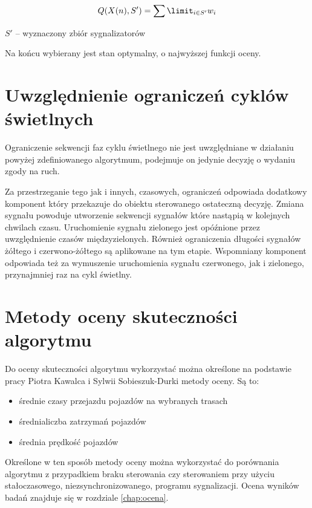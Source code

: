 \begin{equation}
\label{eq:wagi_suma}
	Q (X(n), S') = \sum\limit_{i \in S'} w_{i}
\end{equation}

\begin{math} S' \end{math} \textrm{ -- wyznaczony zbiór sygnalizatorów}

\vspace{0.5cm}
Na końcu wybierany jest stan optymalny, o najwyższej funkcji oceny.

\section{Uwzględnienie ograniczeń cyklów świetlnych}
Ograniczenie sekwencji faz cyklu świetlnego nie jest uwzględniane w działaniu powyżej zdefiniowanego algorytmum, podejmuje on jedynie decyzję o wydaniu zgody na ruch.

Za przestrzeganie tego jak i innych, czasowych, ograniczeń odpowiada dodatkowy komponent który przekazuje do obiektu sterowanego ostateczną decyzję. Zmiana sygnału powoduje utworzenie sekwencji sygnałów które nastąpią w kolejnych chwilach czasu. Uruchomienie sygnału zielonego jest opóźnione przez uwzględnienie czasów międzyzielonych. Również ograniczenia długości sygnałów żółtego i czerwono-żółtego są aplikowane na tym etapie. Wspomniany komponent odpowiada też za wymuszenie uruchomienia sygnału czerwonego, jak i zielonego, przynajmniej raz na cykl świetlny.

\section{Metody oceny skuteczności algorytmu}
Do oceny skuteczności algorytmu wykorzystać można określone na podstawie pracy Piotra Kawalca i Sylwii Sobieszuk-Durki \cite{kawalec+sobieszuk-durka} metody oceny. Są to:
\begin{itemize}
	\item średnie czasy przejazdu pojazdów na wybranych trasach
	\item średnialiczba zatrzymań pojazdów
	\item średnia prędkość pojazdów
\end{itemize}

Określone w ten sposób metody oceny można wykorzystać do porównania algorytmu z przypadkiem braku sterowania czy sterowaniem przy użyciu stałoczasowego, niezsynchronizowanego, programu sygnalizacji. Ocena wyników badań znajduje się w rozdziale \ref{chap:ocena}.